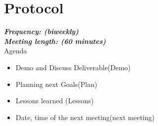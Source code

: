 \documentclass{scrartcl}
\begin{document}
\printbibliography[heading=bibintoc]


\pagebreak









  	
  
  	

  	
  	
  	
  
  	
  	
  	
  
  	
  	
  
  	


  	





	
	
	




 









 

 























                      
        
    


   

   
    
   
  

\section{Protocol}
\textbf{\textit{Frequency: (biweekly) \\
Meeting length: (60 minutes)}}\\

Agenda

\begin{itemize}
  	\item Demo and Discuss Deliverable(Demo)
  	\item Planning next Goals(Plan)
  	\item Lessons learned (Lessons)
  	\item Date, time of the next meeting(next meeting)
 \end{itemize} 	
\end{document}
